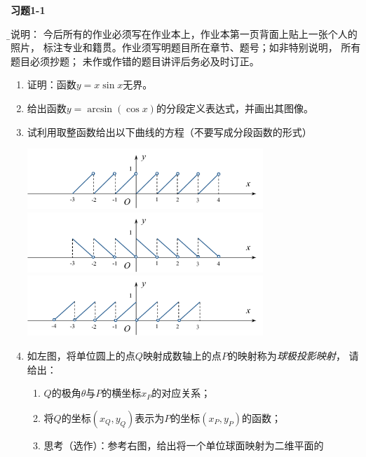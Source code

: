 \begin{ext}
	{\centering\bf 习题1-1}
	
	{\b\kaishu 说明：	今后所有的作业必须写在作业本上，作业本第一页背面上贴上一张个人的照片，
	标注专业和籍贯。作业须写明题目所在章节、题号；如非特别说明，	所有题目必须抄题；
	未作或作错的题目讲评后务必及时订正。}
	
	\begin{enumerate}  
	  \item 证明：函数$y=x\sin x$无界。
	  \item 给出函数$y=\arcsin(\cos x)$的分段定义表达式，并画出其图像。
	  \item 试利用取整函数给出以下曲线的方程（不要写成分段函数的形式）
	  \begin{center}
	  	\includegraphics[width=0.7\textwidth]{./images/Ch01/f1.pdf}\\
	  	\includegraphics[width=0.7\textwidth]{./images/Ch01/f2.pdf}\\
	  	\includegraphics[width=0.7\textwidth]{./images/Ch01/f3.pdf}
	  \end{center}
	  \item 如左图，将单位圆上的点$Q$映射成数轴上的点$P$的映射称为{\it 球极投影映射}，
	  请给出：
	  \begin{enumerate}[(1)]
	    \item $Q$的极角$\theta$与$P$的横坐标$x_P$的对应关系；
	    \item 将$Q$的坐标$(x_Q,y_Q)$表示为$P$的坐标$(x_P,y_P)$的函数；
	    \item 思考（选作）：参考右图，给出将一个单位球面映射为二维平面的

\end{enumerate}
\end{enumerate}
\end{ext}
